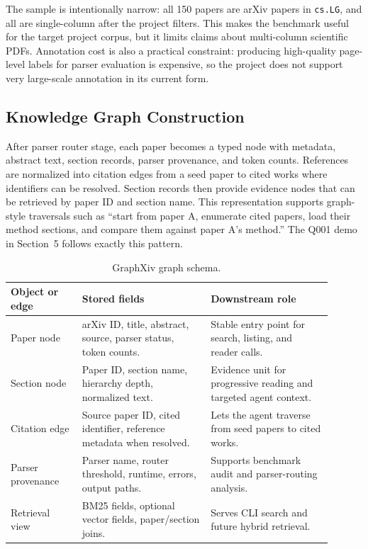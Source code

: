 \documentclass[10pt]{article}
\begin{document}
The sample is intentionally narrow: all 150 papers are arXiv papers in \texttt{cs.LG}, and all are single-column after the project filters. This makes the benchmark useful for the target project corpus, but it limits claims about multi-column scientific PDFs. Annotation cost is also a practical constraint: producing high-quality page-level labels for parser evaluation is expensive, so the project does not support very large-scale annotation in its current form.


\subsection{Knowledge Graph Construction}

After parser router stage, each paper becomes a typed node with metadata, abstract text, section records, parser provenance, and token counts. References are normalized into citation edges from a seed paper to cited works where identifiers can be resolved. Section records then provide evidence nodes that can be retrieved by paper ID and section name. This representation supports graph-style traversals such as ``start from paper A, enumerate cited papers, load their method sections, and compare them against paper A's method.'' The Q001 demo in Section~5 follows exactly this pattern.

\begin{table}[H]
\centering
\footnotesize
\caption{GraphXiv graph schema.}
\label{tab:kg-schema}
\begin{tabular}{p{0.20\linewidth}p{0.36\linewidth}p{0.34\linewidth}}
\toprule
Object or edge & Stored fields & Downstream role \\
\midrule
Paper node & arXiv ID, title, abstract, source, parser status, token counts. & Stable entry point for search, listing, and reader calls. \\
Section node & Paper ID, section name, hierarchy depth, normalized text. & Evidence unit for progressive reading and targeted agent context. \\
Citation edge & Source paper ID, cited identifier, reference metadata when resolved. & Lets the agent traverse from seed papers to cited works. \\
Parser provenance & Parser name, router threshold, runtime, errors, output paths. & Supports benchmark audit and parser-routing analysis. \\
Retrieval view & BM25 fields, optional vector fields, paper/section joins. & Serves CLI search and future hybrid retrieval. \\
\bottomrule
\end{tabular}
\end{table}
\end{document}
